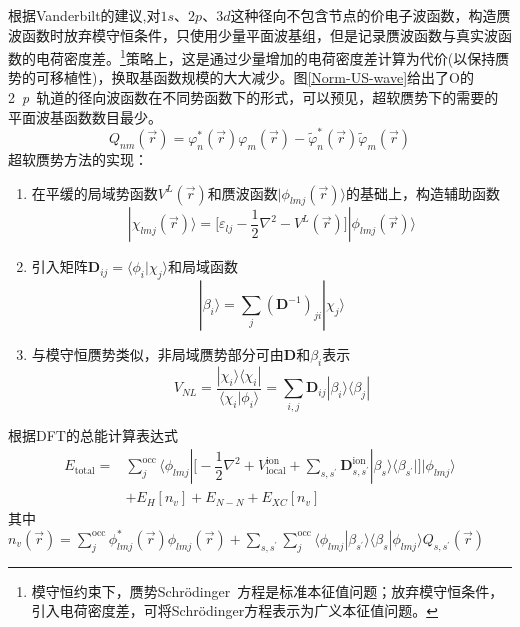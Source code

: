 根据Vanderbilt的建议,对$1s$、$2p$、$3d$这种径向不包含节点的价电子波函数，构造赝波函数时放弃模守恒条件，只使用少量平面波基组，但是记录赝波函数与真实波函数的电荷密度差。\footnote{模守恒约束下，赝势\textrm{Schr\"odinger~}方程是标准本征值问题；放弃模守恒条件，引入电荷密度差，可将\textrm{Schr\"odinger}方程表示为广义本征值问题。}策略上，这是通过少量增加的电荷密度差计算为代价(以保持赝势的可移植性)，换取基函数规模的大大减少。图\ref{Norm-US-wave}给出了\textrm{O}的2~\textit{p}~轨道的径向波函数在不同势函数下的形式，可以预见，超软赝势下的需要的平面波基函数数目最少。
\begin{equation}
	Q_{nm}(\vec r)=\varphi_n^{\ast}(\vec r)\varphi_m(\vec r)-\tilde\varphi_n^{\ast}(\vec r)\tilde\varphi_m(\vec r)
  \label{eq:uspp_4}
\end{equation}
超软赝势方法的实现：
\begin{enumerate}
	\item 在平缓的局域势函数$V^L(\vec r)$和赝波函数$|\phi_{lmj}(\vec r)\rangle$的基础上，构造辅助函数
\begin{equation}
	|\chi_{lmj}(\vec r)\rangle=\bigg[\varepsilon_{lj}-\dfrac12\nabla^2-V^L(\vec r)\bigg]|\phi_{lmj}(\vec r)\rangle
  \label{eq:uspp_1}
\end{equation}
	\item 引入矩阵$\mathbf{D}_{ij}=\langle\phi_i|\chi_j\rangle$和局域函数
\begin{equation}
	|\beta_i\rangle=\sum_j(\mathbf{D}^{-1})_{ji}|\chi_{j}\rangle
  \label{eq:uspp_2}
\end{equation}
	\item 与模守恒赝势类似，非局域赝势部分可由$\mathbf{D}$和$\beta_i$表示
\begin{equation}
	V_{NL}=\dfrac{|\chi_i\rangle\langle\chi_i|}{\langle\chi_i|\phi_i\rangle}=\sum_{i,j}\mathbf{D}_{ij}|\beta_i\rangle\langle\beta_j|
  \label{eq:uspp_3}
\end{equation}
\end{enumerate}
根据DFT的总能计算表达式
	\begin{equation}
		\begin{aligned}
			E_{\mathrm{total}}=&\sum_j^{\mathrm{occ}}\langle\phi_{lmj}|\bigg[-\dfrac12\nabla^2+V_{\mathrm{local}}^{\mathrm{ion}}+\sum_{s,s^{\prime}}\mathbf{D}_{s,s^{\prime}}^{\mathrm{ion}}|\beta_s\rangle\langle\beta_{s^{\prime}}|\bigg]|\phi_{lmj}\rangle\\
			&+E_{H}[n_v]+E_{N-N}+E_{XC}[n_v]
		\end{aligned}
  \label{eq:uspp_5}
	\end{equation}
其中$n_v(\vec r)=\sum\limits_j^{\mathrm{occ}}\phi_{lmj}^{\ast}(\vec r)\phi_{lmj}(\vec r)+\sum\limits_{s,s^{\prime}}\sum\limits_j^{\mathrm{occ}}\langle\phi_{lmj}|\beta_{s^{\prime}}\rangle\langle\beta_s|\phi_{lmj}\rangle Q_{s,s^{\prime}}(\vec r)$
